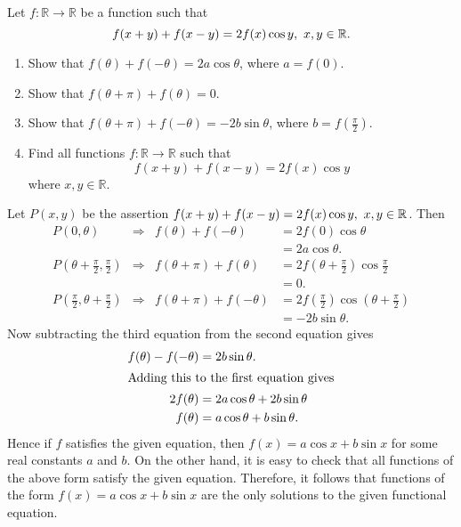 \begin{question}
    Let $f:\mathbb{R} \rightarrow \mathbb{R}$ be a function such that 
    \[f(x + y) + f(x - y) = 2f(x)\cos y,\text{\space} x, y \in \mathbb{R}.\]
    \begin{enumerate}
        \item Show that $f(\theta) + f(-\theta) = 2a\cos \theta$, where $a =
            f(0)$. 
        
        \item Show that $f(\theta + \pi) + f(\theta) = 0$.
        
        \item Show that $f(\theta + \pi) + f(-\theta) = -2b\sin\theta$, where
            $b = f\left(\frac{\pi}{2}\right)$.
        
        \item Find all functions $f:\mathbb{R} \rightarrow \mathbb{R}$ such
            that $$f(x + y) + f(x - y) = 2f(x)\cos y$$ where $x,y \in
            \mathbb{R}$.
    \end{enumerate}
\end{question}
\begin{solution}
    Let $P(x, y)$ be the assertion $f(x + y) + f(x - y) = 2f(x)\cos
    y,\text{\space} x, y \in \mathbb{R}$. Then
    \begin{align*}
        P(0, \theta) &\Longrightarrow & f(\theta) + f(-\theta) &= 2f(0)\cos \theta\\
        & & &= 2a\cos \theta.\\
        P \left( \theta + \frac{\pi}{2}, \frac{\pi}{2} \right) &\Longrightarrow & f(\theta + \pi) + f(\theta) &= 2f \left( \theta + \frac{\pi}{2} \right) \cos \frac{\pi}{2}\\
        & & &= 0.\\
        P \left(\frac{\pi}{2}, \theta + \frac{\pi}{2} \right) & \Longrightarrow & f(\theta + \pi) + f(-\theta) &= 2f \left( \frac{\pi}{2} \right) \cos \left( \theta + \frac{\pi}{2} \right)\\
        & & &= -2b \sin \theta.
    \end{align*}
    Now subtracting the third equation from the second equation gives
    \begin{align*}
        f(\theta) - f(-\theta) &= 2b \sin \theta. \\
    \intertext{Adding this to the first equation gives}
        2f(\theta) &= 2a \cos \theta + 2b \sin \theta\\
        f(\theta) &= a \cos \theta + b \sin \theta. 
    \end{align*}
    Hence if $f$ satisfies the given equation, then $f(x) = a \cos x + b \sin
    x$ for some real constants $a$ and $b$. On the other hand, it is easy to
    check that all functions of the above form satisfy the given equation.
    Therefore, it follows that functions of the form $f(x) = a \cos x + b \sin
    x$ are the only solutions to the given functional equation.
\end{solution}


